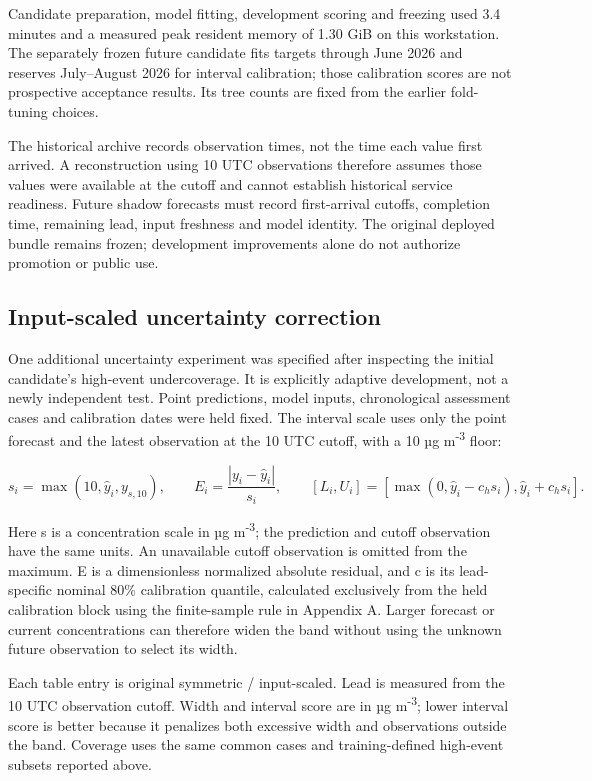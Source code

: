 \documentclass[11pt,a4paper]{article}
\begin{document}
Candidate preparation, model fitting, development scoring and freezing used 3.4 minutes and a measured peak resident memory of 1.30 GiB on this workstation. The separately frozen future candidate fits targets through June 2026 and reserves July–August 2026 for interval calibration; those calibration scores are not prospective acceptance results. Its tree counts are fixed from the earlier fold-tuning choices.

The historical archive records observation times, not the time each value first arrived. A reconstruction using 10 UTC observations therefore assumes those values were available at the cutoff and cannot establish historical service readiness. Future shadow forecasts must record first-arrival cutoffs, completion time, remaining lead, input freshness and model identity. The original deployed bundle remains frozen; development improvements alone do not authorize promotion or public use.

\subsection{Input-scaled uncertainty correction}

One additional uncertainty experiment was specified after inspecting the initial candidate's high-event undercoverage. It is explicitly adaptive development, not a newly independent test. Point predictions, model inputs, chronological assessment cases and calibration dates were held fixed. The interval scale uses only the point forecast and the latest observation at the 10 UTC cutoff, with a 10 µg m\textsuperscript{-3} floor:

\begin{equation}s_i=\max(10,\hat y_i,y_{s,10}),\qquad E_i=\frac{|y_i-\hat y_i|}{s_i},\qquad [L_i,U_i]=[\max(0,\hat y_i-c_hs_i),\hat y_i+c_hs_i].\end{equation}

Here s is a concentration scale in µg m\textsuperscript{-3}; the prediction and cutoff observation have the same units. An unavailable cutoff observation is omitted from the maximum. E is a dimensionless normalized absolute residual, and c is its lead-specific nominal 80\% calibration quantile, calculated exclusively from the held calibration block using the finite-sample rule in Appendix A. Larger forecast or current concentrations can therefore widen the band without using the unknown future observation to select its width.

Each table entry is original symmetric / input-scaled. Lead is measured from the 10 UTC observation cutoff. Width and interval score are in µg m\textsuperscript{-3}; lower interval score is better because it penalizes both excessive width and observations outside the band. Coverage uses the same common cases and training-defined high-event subsets reported above.
\end{document}

